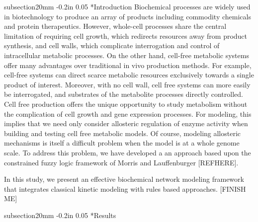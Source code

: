 \documentclass[12pt]{article}
\makeatletter
\renewcommand\section{\@startsection
	{subsection}{2}{0mm}
	{-0.2in}
	{0.05\baselineskip}
	{\normalfont\large\bfseries}}
\makeatother
\begin{document}
\section*{Introduction}
Biochemical processes are widely used in biotechnology to produce an array of products including commodity chemicals and protein therapeutics.
However, whole-cell processes share the central limitation of requiring cell growth, 
which redirects resources away from product synthesis, and cell walls, which complicate interrogation and control of intracellular metabolic processes.
On the other hand, cell-free metabolic systems offer many advantages over traditional in vivo production methods. 
For example, cell-free systems can direct scarce metabolic resources exclusively towards a single product of interest. 
Moreover, with no cell wall, cell free systems can more easily be interrogated, and substrates of the metabolite processes directly controlled.
Cell free production offers the unique opportunity to study metabolism without the complication of cell growth and gene expression processes.
For modeling, this implies that we need only consider allosteric regulation of enzyme activity when building and testing cell free metabolic models.
Of course, modeling allosteric mechanisms is itself a difficult problem when the model is at a whole genome scale. To address this problem, we have developed a
an approach based upon the constrained fuzzy logic framework of Morris and Lauffenburger [REFHERE].

In this study, we present an effective biochemical network modeling framework that integrates classical kinetic modeling with rules based approaches.
[FINISH ME]

\clearpage

\section*{Results}
\end{document}
